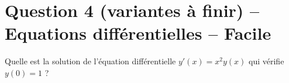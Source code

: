 \documentclass[12pt,a4paper]{article}
\begin{document}
\section{Question 4 (variantes à finir) -- Equations différentielles -- Facile}

\begin{question}

Quelle est la solution de l'équation différentielle $y'(x)=x^2 y(x)$ qui vérifie $y(0)=1$ ?



\begin{answers}  
\end{answers}
\end{question}
\end{document}
